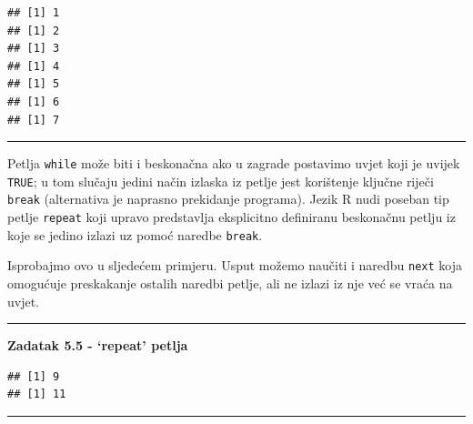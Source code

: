 \documentclass[]{book}
\newenvironment{Shaded}{\begin{snugshade}}{\end{snugshade}}
\newcommand{\KeywordTok}[1]{\textcolor[rgb]{0.13,0.29,0.53}{\textbf{#1}}}
\newcommand{\DecValTok}[1]{\textcolor[rgb]{0.00,0.00,0.81}{#1}}
\newcommand{\StringTok}[1]{\textcolor[rgb]{0.31,0.60,0.02}{#1}}
\newcommand{\CommentTok}[1]{\textcolor[rgb]{0.56,0.35,0.01}{\textit{#1}}}
\newcommand{\ControlFlowTok}[1]{\textcolor[rgb]{0.13,0.29,0.53}{\textbf{#1}}}
\newcommand{\OperatorTok}[1]{\textcolor[rgb]{0.81,0.36,0.00}{\textbf{#1}}}
\newcommand{\NormalTok}[1]{#1}
\theoremstyle{definition}
\theoremstyle{definition}
\theoremstyle{definition}
\theoremstyle{remark}
\begin{document}
\begin{verbatim}
## [1] 1
## [1] 2
## [1] 3
## [1] 4
## [1] 5
## [1] 6
## [1] 7
\end{verbatim}

\begin{center}\rule{0.5\linewidth}{\linethickness}\end{center}

Petlja \texttt{while} može biti i beskonačna ako u zagrade postavimo
uvjet koji je uvijek \texttt{TRUE}; u tom slučaju jedini način izlaska
iz petlje jest korištenje ključne riječi \texttt{break} (alternativa je
naprasno prekidanje programa). Jezik R nudi poseban tip petlje
\texttt{repeat} koji upravo predstavlja eksplicitno definiranu
beskonačnu petlju iz koje se jedino izlazi uz pomoć naredbe
\texttt{break}.

Isprobajmo ovo u sljedećem primjeru. Usput možemo naučiti i naredbu
\texttt{next} koja omogućuje preskakanje ostalih naredbi petlje, ali ne
izlazi iz nje već se vraća na uvjet.

\begin{center}\rule{0.5\linewidth}{\linethickness}\end{center}

\textbf{Zadatak 5.5 - `repeat' petlja}

\begin{Shaded}
\end{Shaded}

\begin{verbatim}
## [1] 9
## [1] 11
\end{verbatim}

\begin{center}\rule{0.5\linewidth}{\linethickness}\end{center}
\end{document}
